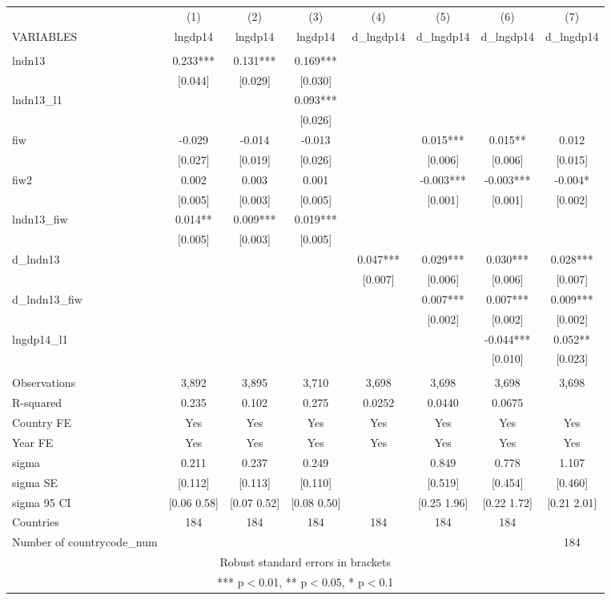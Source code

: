 \begin{tabular}{lccccccc} \hline
 & (1) & (2) & (3) & (4) & (5) & (6) & (7) \\
VARIABLES & lngdp14 & lngdp14 & lngdp14 & d\_lngdp14 & d\_lngdp14 & d\_lngdp14 & d\_lngdp14 \\ \hline
 &  &  &  &  &  &  &  \\
lndn13 & 0.233*** & 0.131*** & 0.169*** &  &  &  &  \\
 & [0.044] & [0.029] & [0.030] &  &  &  &  \\
lndn13\_l1 &  &  & 0.093*** &  &  &  &  \\
 &  &  & [0.026] &  &  &  &  \\
fiw & -0.029 & -0.014 & -0.013 &  & 0.015*** & 0.015** & 0.012 \\
 & [0.027] & [0.019] & [0.026] &  & [0.006] & [0.006] & [0.015] \\
fiw2 & 0.002 & 0.003 & 0.001 &  & -0.003*** & -0.003*** & -0.004* \\
 & [0.005] & [0.003] & [0.005] &  & [0.001] & [0.001] & [0.002] \\
lndn13\_fiw & 0.014** & 0.009*** & 0.019*** &  &  &  &  \\
 & [0.005] & [0.003] & [0.005] &  &  &  &  \\
d\_lndn13 &  &  &  & 0.047*** & 0.029*** & 0.030*** & 0.028*** \\
 &  &  &  & [0.007] & [0.006] & [0.006] & [0.007] \\
d\_lndn13\_fiw &  &  &  &  & 0.007*** & 0.007*** & 0.009*** \\
 &  &  &  &  & [0.002] & [0.002] & [0.002] \\
lngdp14\_l1 &  &  &  &  &  & -0.044*** & 0.052** \\
 &  &  &  &  &  & [0.010] & [0.023] \\
 &  &  &  &  &  &  &  \\
Observations & 3,892 & 3,895 & 3,710 & 3,698 & 3,698 & 3,698 & 3,698 \\
R-squared & 0.235 & 0.102 & 0.275 & 0.0252 & 0.0440 & 0.0675 &  \\
Country FE & Yes & Yes & Yes & Yes & Yes & Yes & Yes \\
Year FE & Yes & Yes & Yes & Yes & Yes & Yes & Yes \\
sigma & 0.211 & 0.237 & 0.249 &  & 0.849 & 0.778 & 1.107 \\
sigma SE & [0.112] & [0.113] & [0.110] &  & [0.519] & [0.454] & [0.460] \\
sigma 95 CI & [0.06 0.58] & [0.07 0.52] & [0.08 0.50] &  & [0.25 1.96] & [0.22 1.72] & [0.21 2.01] \\
Countries & 184 & 184 & 184 & 184 & 184 & 184 &  \\
 Number of countrycode\_num &  &  &  &  &  &  & 184 \\ \hline
\multicolumn{8}{c}{ Robust standard errors in brackets} \\
\multicolumn{8}{c}{ *** p$<$0.01, ** p$<$0.05, * p$<$0.1} \\
\end{tabular}
